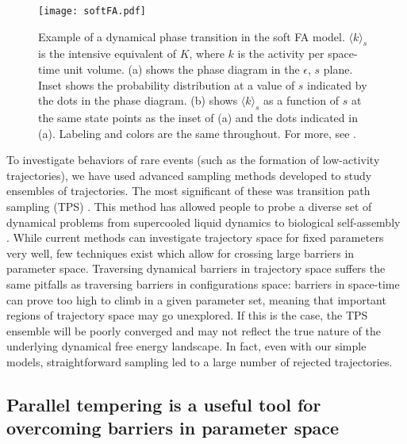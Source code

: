 \documentclass[11pt]{article}
\begin{document}
\begin{figure}[b!] %
   \centering
   \texttt{[image: softFA.pdf]} 
   \caption{Example of a dynamical phase transition in the soft FA model. $\langle k \rangle_{s}$ is the intensive equivalent of $K$, where $k$ is the activity per space-time unit volume.  (a) shows the phase diagram in the $\epsilon$, $s$ plane.  Inset shows the probability distribution at a value of $s$ indicated by the dots in the phase diagram. (b) shows $\langle k \rangle_{s}$ as a function of $s$ at the same state points as the inset of (a) and the dots indicated in (a).  Labeling and colors are the same throughout.  For more, see \cite{Elmatad_PNAS_2010}.}
   \label{fig:softFA}
\end{figure}

To investigate behaviors of rare events (such as the formation of low-activity trajectories), we have used advanced sampling methods developed to study ensembles of trajectories. The most significant of these was transition path sampling (TPS) \cite{Bolhuis_AnnuRevPhysChem_2002}.  This method has allowed people to probe a diverse set of dynamical problems from supercooled liquid dynamics \cite{Merolle_PNAS_Aug_2005} to biological self-assembly \cite{TenWolde2002}. While current methods can investigate trajectory space for fixed parameters very well, few techniques exist which allow for crossing large barriers  in parameter space. Traversing dynamical barriers in trajectory space suffers the same pitfalls as traversing barriers in configurations space: barriers in space-time can prove too high to climb in a given parameter set, meaning that important regions of trajectory space may go unexplored.  If this is the case, the TPS ensemble will be poorly converged and may not reflect the true nature of the underlying dynamical free energy landscape. In fact, even with our simple models, straightforward sampling led to a large number of rejected trajectories.

\subsection*{Parallel tempering is a useful tool for overcoming barriers in parameter space}
\end{document}

